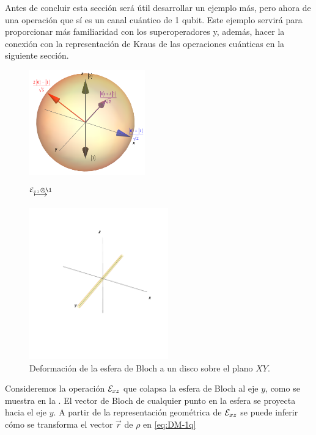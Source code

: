 Antes de concluir esta sección será útil desarrollar un ejemplo más, 
pero ahora de una operación que sí es un canal cuántico de 1 qubit. Este 
ejemplo servirá para proporcionar más familiaridad con  
los superoperadores y, además, hacer la conexión con 
la representación de Kraus de las operaciones cuánticas en la siguiente sección.

\begin{figure} %
    \centering
    \begin{minipage}{.4\textwidth}
        \centering
        \includegraphics[width=5cm]
        {img-congreso/bloch.png}
    \end{minipage}
    $\stackrel{\E_{xz}\otimes\1 \vspace{1cm}}{\longmapsto}$
    \begin{minipage}{0.4\textwidth}
        \centering
        \includegraphics[width=6cm]
        {img-congreso/lineY}
    \end{minipage}
    \caption{Deformación de la esfera de Bloch a un disco sobre el plano $XY$.}
    \label{fig:QC-ex2}
\end{figure} %
Consideremos la operación $\mathcal{E}_{xz}$ que colapsa la esfera de Bloch
al eje $y$, como se muestra en la . El vector de 
Bloch de cualquier punto en la esfera se proyecta hacia el eje $y$.
A partir de la representación geométrica de $\mathcal{E}_{xz}$ 
se puede inferir cómo se transforma el vector $\vec{r}$
de $\rho$ en \eqref{eq:DM-1q}
